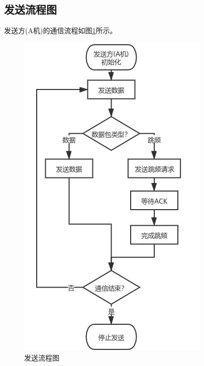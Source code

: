 \documentclass[12pt]{ctexart}
\begin{document}
\subsection{发送流程图}
	发送方(A机)的通信流程如图\ref{send-routine}所示。
\begin{figure}[htbp]
	\centering
 	\includegraphics[scale=0.6]{../figures/send-routine.png}
	\caption{发送流程图}
	\label{send-routine}
\end{figure}
\end{document}
